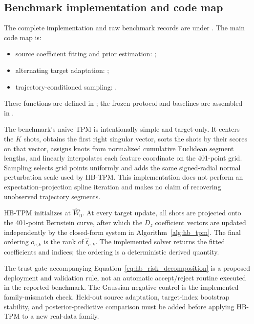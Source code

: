 \documentclass[preprint,12pt,number]{elsarticle}
\begin{document}
\subsection{Benchmark implementation and code map}
The complete implementation and raw benchmark records are under . The main code map is:
\begin{itemize}
    \item source coefficient fitting and prior estimation: ;
    \item alternating target adaptation: ;
    \item trajectory-conditioned sampling: .
\end{itemize}
These functions are defined in ; the frozen protocol and baselines are assembled in .

The benchmark's naive TPM is intentionally simple and target-only. It centers the $K$ shots, obtains the first right singular vector, sorts the shots by their scores on that vector, assigns knots from normalized cumulative Euclidean segment lengths, and linearly interpolates each feature coordinate on the 401-point grid. Sampling selects grid points uniformly and adds the same signed-radial normal perturbation scale used by HB-TPM. This implementation does not perform an expectation--projection spline iteration and makes no claim of recovering unobserved trajectory segments.

HB-TPM initializes at $\widehat W_0$. At every target update, all shots are projected onto the 401-point Bernstein curve, after which the $D_z$ coefficient vectors are updated independently by the closed-form system in Algorithm~\ref{alg:hb_tpm}. The final ordering $o_{c,k}$ is the rank of $\widehat t_{c,k}$. The implemented solver returns the fitted coefficients and indices; the ordering is a deterministic derived quantity.

The trust gate accompanying Equation~\ref{eq:hb_risk_decomposition} is a proposed deployment and validation rule, not an automatic accept/reject routine executed in the reported benchmark. The Gaussian negative control is the implemented family-mismatch check. Held-out source adaptation, target-index bootstrap stability, and posterior-predictive comparison must be added before applying HB-TPM to a new real-data family.
\end{document}
